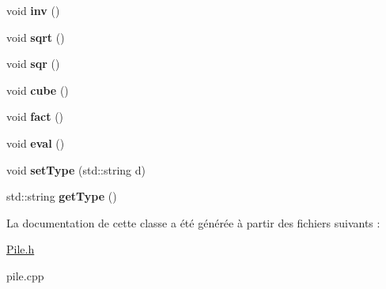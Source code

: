 \begin{DoxyCompactItemize}
\item 
\hypertarget{class_pile_a040844b7b06a3aa8a25c47079858e5d4}{void {\bfseries inv} ()}\label{class_pile_a040844b7b06a3aa8a25c47079858e5d4}

\item 
\hypertarget{class_pile_a15e52c1dca0ef1e78af39c69f814e01a}{void {\bfseries sqrt} ()}\label{class_pile_a15e52c1dca0ef1e78af39c69f814e01a}

\item 
\hypertarget{class_pile_abd1c5a18cb8dd304e377d74fcec5a513}{void {\bfseries sqr} ()}\label{class_pile_abd1c5a18cb8dd304e377d74fcec5a513}

\item 
\hypertarget{class_pile_aee724c6620382459f78fab4fb08749eb}{void {\bfseries cube} ()}\label{class_pile_aee724c6620382459f78fab4fb08749eb}

\item 
\hypertarget{class_pile_a582a24a17a82fc63985900765b0499b4}{void {\bfseries fact} ()}\label{class_pile_a582a24a17a82fc63985900765b0499b4}

\item 
\hypertarget{class_pile_a9fbff00a90c14aca3b093b080c8b0f0b}{void {\bfseries eval} ()}\label{class_pile_a9fbff00a90c14aca3b093b080c8b0f0b}

\item 
\hypertarget{class_pile_adeeabcc051cf4a7449d117ff4a3a848a}{void {\bfseries set\-Type} (std\-::string d)}\label{class_pile_adeeabcc051cf4a7449d117ff4a3a848a}

\item 
\hypertarget{class_pile_a349a863ee08e9c966a9277cef6b55619}{std\-::string {\bfseries get\-Type} ()}\label{class_pile_a349a863ee08e9c966a9277cef6b55619}

\end{DoxyCompactItemize}


La documentation de cette classe a été générée à partir des fichiers suivants \-:\begin{DoxyCompactItemize}
\item 
\hyperlink{_pile_8h}{Pile.\-h}\item 
pile.\-cpp\end{DoxyCompactItemize}
